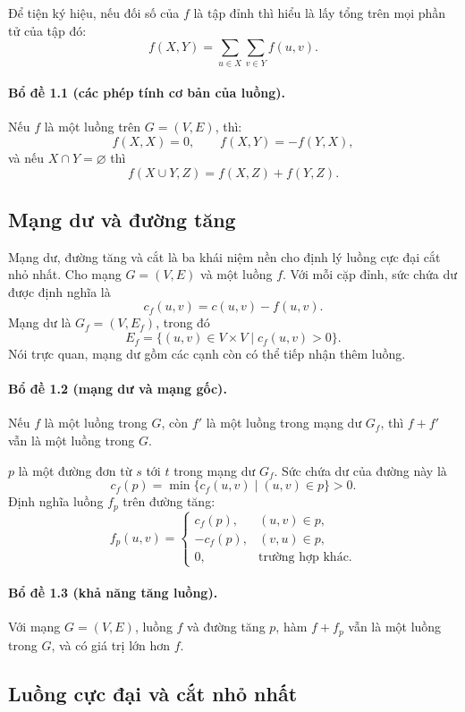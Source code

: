 \documentclass[11pt]{article}
\begin{document}
Để tiện ký hiệu, nếu đối số của \(f\) là tập đỉnh thì hiểu là lấy tổng trên
mọi phần tử của tập đó:
\[
  f(X,Y)=\sum_{u\in X}\sum_{v\in Y} f(u,v).
\]

\paragraph{Bổ đề 1.1 (các phép tính cơ bản của luồng).}
Nếu \(f\) là một luồng trên \(G=(V,E)\), thì:
\[
  f(X,X)=0,\qquad
  f(X,Y)=-f(Y,X),
\]
và nếu \(X\cap Y=\varnothing\) thì
\[
  f(X\cup Y,Z)=f(X,Z)+f(Y,Z).
\]

\subsection{Mạng dư và đường tăng}

Mạng dư, đường tăng và cắt là ba khái niệm nền cho định lý luồng cực đại cắt
nhỏ nhất. Cho mạng \(G=(V,E)\) và một luồng \(f\). Với mỗi cặp đỉnh, sức chứa
dư được định nghĩa là
\[
  c_f(u,v)=c(u,v)-f(u,v). \tag{1.2}
\]
Mạng dư là \(G_f=(V,E_f)\), trong đó
\[
  E_f=\{(u,v)\in V\times V\mid c_f(u,v)>0\}.
\]
Nói trực quan, mạng dư gồm các cạnh còn có thể tiếp nhận thêm luồng.

\paragraph{Bổ đề 1.2 (mạng dư và mạng gốc).}
Nếu \(f\) là một luồng trong \(G\), còn \(f'\) là một luồng trong mạng dư
\(G_f\), thì \(f+f'\) vẫn là một luồng trong \(G\).

 \(p\) là một đường đơn từ \(s\) tới \(t\) trong mạng dư
\(G_f\). Sức chứa dư của đường này là
\[
  c_f(p)=\min\{c_f(u,v)\mid (u,v)\in p\}>0.
\]
Định nghĩa luồng \(f_p\) trên đường tăng:
\[
  f_p(u,v)=
  \begin{cases}
    c_f(p), & (u,v)\in p,\\
    -c_f(p), & (v,u)\in p,\\
    0, & \text{trường hợp khác.}
  \end{cases}
\]

\paragraph{Bổ đề 1.3 (khả năng tăng luồng).}
Với mạng \(G=(V,E)\), luồng \(f\) và đường tăng \(p\), hàm \(f+f_p\) vẫn là
một luồng trong \(G\), và có giá trị lớn hơn \(f\).

\subsection{Luồng cực đại và cắt nhỏ nhất}
\end{document}
